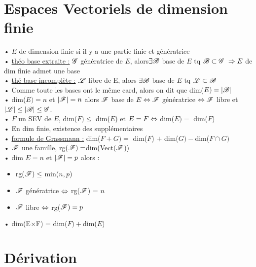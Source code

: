 \documentclass[12 pt]{exampleclass}
\begin{document}
\section{Espaces Vectoriels de dimension finie}

\begin{flushleft}
\begin{doublespace}

	• $E$ de dimension finie si il y a une partie finie et génératrice\\
	• \underline{théo base extraite :} $\mathscr{G}$ génératrice de $E$, alors$\exists \mathscr{B}$  base de $E$ tq $\mathscr{B} \subset \mathscr{G} \ \Rightarrow E$ de dim finie admet une base\\
	• \underline{thé base incomplète :} $\mathscr{L}$ libre de E, alors $\exists \mathscr{B}$ base de $E$ tq $\mathscr{L} \subset \mathscr{B}$\\
	• Comme toute les bases ont le même card, alors on dit que dim($E) = |\mathscr{B}|$\\
	• dim($E) = n$ et $|\mathscr{F}| = n$ alors $\mathscr{F}$ base de $E \Leftrightarrow \mathscr{F}$ génératrice $\Leftrightarrow \mathscr{F}$ libre et $|\mathscr{L}| \leq |\mathscr{B}| \leq \mathscr{G}$.\\
	• $F$ un SEV de $E$, dim($F) \leq$ dim($E$) et $E=F \Leftrightarrow$ dim($E) =$ dim($F$)\\
	• En dim finie, existence des supplémentaires\\
	• \underline{formule de Grassmann :} dim($F+G) =$ dim($F$) $+$ dim($G) - $dim($F\cap G)$\\
	• $\mathscr{F}$ une famille, rg($\mathscr{F}) = $dim(Vect($\mathscr{F}$))\\
	• dim $E = n$ et $|\mathscr{F}| = p$ alors : 
	\quad \begin{itemize}
			\item rg($\mathscr{F}) \leq$ min($n,p$)
			\item $\mathscr{F}$ génératrice $\Leftrightarrow$ rg($\mathscr{F}$) = $n$
			\item $\mathscr{F}$ libre $\Leftrightarrow$ rg($\mathscr{F}) = p$
		\end{itemize}
	• dim(E$\times$F) = dim($F) + $dim($E$)\\

\end{doublespace}
\end{flushleft}

\section{Dérivation}
\end{document}
